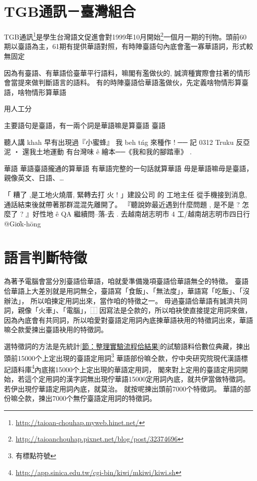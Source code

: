 \documentclass[final,oneside,onecolumn,12pt,a4paper]{book}%
\begin{document}

\section{TGB通訊－臺灣組合}
\label{節：TGB通訊－臺灣組合}
TGB通訊\footnote{\url{http://taioan-chouhap.myweb.hinet.net/}}是學生台灣語文促進會對1999年10月開始\footnote{\url{http://taioanchouhap.pixnet.net/blog/post/32374696}}一個月一期的刊物。頭前60期以臺語為主，61期有提供華語對照，有時陣臺語句內底會濫一寡華語詞，形式較無固定

因為有臺語、有華語佮臺華平行語料，嘛閣有濫做伙的, 誠濟種實際會拄著的情形會當提來做判斷語言的語料。
有的時陣臺語佮華語濫做伙，先定義啥物情形算臺語，啥物情形算華語

用人工分

主要語句是臺語，有一兩个詞是華語嘛是算臺語
臺語

聽人講 khah 早有出現過『小蜜蜂』
我 beh tńg 來種作 ! ── 記 0312 Truku 反亞泥 ‧ 還我土地運動
有台灣味 ê 繪本──《我和我的腳踏車》 .

華語
華語臺語攏通的算華語
有華語完整的一句話就算華語
毋是華語嘛毋是臺語，親像英文、日語、…

「 糟了 ,是工地火燒厝, 緊轉去打 火 ! 」建設公司 的 工地主任 從手機接到消息,通話結束後就帶著那群混混先離開了。
『聽說妳最近遇到什麼問題 , 是不是 ? 怎麼了 ? 』好性地 ê QA 繼續問--落-去 .
去越南胡志明市 4 工/越南胡志明市四日行 @Gio̍k-hōng


\section{語言判斷特徵}
\label{節：語言判斷特徵}
為著予電腦會當分別臺語佮華語，咱就愛準備幾項臺語佮華語無仝的特徵。
臺語佮華語上大差別就是用詞無仝，臺語寫「食飯」、「無法度」，華語寫「吃飯」、「沒辦法」，
所以咱揀定用詞出來，當作咱的特徵之一。
毋過臺語佮華語有誠濟共同詞，親像「火車」、「電腦」，⿰因寫法是仝款的，所以咱袂使直接提定用詞來做，因為內底會有共同詞，所以咱愛對臺語定用詞內底揀華語袂用的特徵詞出來，華語嘛仝款愛揀出臺語袂用的特徵詞。

選特徵詞的方法是先統計\ref{節：整理實驗流程佮結果}的試驗語料佮數位典藏，揀出頭前15000个上定出現的臺語定用詞\footnote{有標點符號}
華語部份嘛仝款，佇中央研究院現代漢語標記語料庫\footnote{\url{http://app.sinica.edu.tw/cgi-bin/kiwi/mkiwi/kiwi.sh}}內底揣15000个上定出現的華語定用詞，
閣來對上定用的臺語定用詞開始，若這个定用詞的漢字詞無出現佇華語15000定用詞內底，就共伊當做特徵詞。
若伊出現佇華語定用詞內底，就莫治。
就按呢揀出頭前7000个特徵詞。
華語的部份嘛仝款，揀出7000个無佇臺語定用詞的特徵詞。
\end{document}
